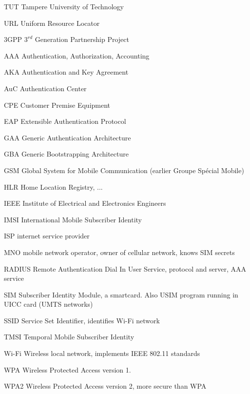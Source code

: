 \documentclass[12pt,a4paper,english]{tutthesis}
\begin{document}
\begin{otherlanguage}{english}
\begin{termlist}
\item [TUT]    Tampere University of Technology
\item [URL]    Uniform Resource Locator
\item[3GPP] $3^{rd}$ Generation Partnership Project
\item[AAA] Authentication, Authorization, Accounting
\item[AKA] Authentication and Key Agreement %
\item[AuC] Authentication Center
\item[CPE] Customer Premise Equipment %
\item[EAP] Extensible Authentication Protocol %
\item[GAA] Generic Authentication Architecture %
\item[GBA] Generic Bootstrapping Architecture
\item[GSM] Global System for Mobile Communication (earlier Groupe Spécial Mobile)
\item[HLR] Home Location Registry, ...
\item[IEEE] Institute of Electrical and Electronics Engineers
\item[IMSI] International Mobile Subscriber Identity
\item[ISP] internet service provider
\item[MNO] mobile network operator, owner of cellular network, knows SIM secrets
\item[RADIUS] Remote Authentication Dial In User Service, protocol and server,  AAA service 
\item[SIM]  Subscriber Identity Module, a smartcard. Also USIM program running in UICC card (UMTS networks)
\item[SSID] Service Set Identifier, identifies Wi-Fi network
\item[TMSI] Temporal Mobile Subscriber Identity
\item[Wi-Fi] Wireless local network, implements IEEE 802.11 standards
\item[WPA] Wireless Protected Access version 1.
\item[WPA2] Wireless Protected Access version 2, more secure than WPA
\end{termlist} 



\end{otherlanguage}
\end{document}
